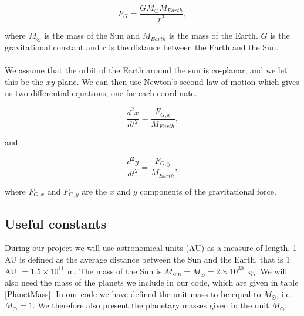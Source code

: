 \documentclass[a4paper, fontsize=11pt]{article}
\begin{document}
\begin{equation}
F_{G} = \dfrac{G M_{\odot}M_{Earth}}{r^2},
\end{equation}

where $M_{\odot}$ is the mass of the Sun and $M_{Earth}$ is the mass of the Earth. $G$ is the gravitational constant and $r$ is the distance between the Earth and the Sun.

\paragraph{}
We assume that the orbit of the Earth around the sun is co-planar, and we let this be the $xy$-plane. We can then use Newton's second law of motion which gives us two differential equations, one for each coordinate.

\begin{equation}
\dfrac{d^2x}{dt^2}=\dfrac{F_{G,x}}{M_{Earth}},
\end{equation}

and 

\begin{equation}
\dfrac{d^2y}{dt^2}=\dfrac{F_{G,y}}{M_{Earth}},
\end{equation}

where $F_{G,x}$ and $F_{G,y}$ are the $x$ and $y$ components of the gravitational force.


\subsection{Useful constants}
During our project we will use astronomical units (AU) as a measure of length. 1 AU is defined as the average distance between the Sun and the Earth, that is 1 AU $= 1.5 \times 10^{11}$ m. The mass of the Sun is $M_{\text{sun}}=M_{\odot}=2 \times 10^{30}$ kg. We will also need the mass of the planets we include in our code, which are given in table \ref{PlanetMass}. In our code we have defined the unit mass to be equal to $M_{\odot}$, i.e. $M_{\odot}=1$. We therefore also present the planetary masses given in the unit $M_{\odot}$.
\end{document}
